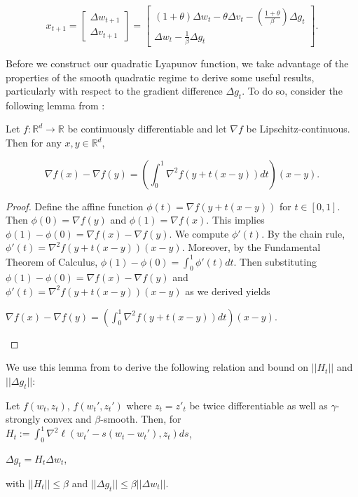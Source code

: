 \documentclass[twoside,11pt]{article}
\begin{document}
\begin{equation}
x_{t+1} = \begin{bmatrix}
    \Delta w_{t+1} \\
    \Delta v_{t+1}
\end{bmatrix} = \begin{bmatrix}
    (1+\theta)\Delta w_t - \theta \Delta v_t - (\frac{1+\theta}{\beta})\Delta g_t \\
    \Delta w_t - \frac{1}{\beta} \Delta g_t
\end{bmatrix}.
\end{equation}

\noindent
Before we construct our quadratic Lyapunov function, we take advantage of the properties of the smooth quadratic regime to derive some useful results, particularly with respect to the gradient difference $\Delta g_t$. To do so, consider the following lemma from \cite{NW06}:

\begin{lemma}
Let $f: \mathbb{R}^d \rightarrow \mathbb{R}$ be continuously differentiable and let $\nabla f$ be Lipschitz-continuous. Then for any $x,y \in \mathbb{R}^d$,

\begin{equation}
\nabla f(x) - \nabla f(y) = (\int_{0}^{1} \nabla^2 f (y + t(x-y))dt)(x-y). 
\end{equation}
\end{lemma}

\begin{proof}
Define the affine function $\phi(t) = \nabla f(y + t(x-y))$ for $t \in [0,1]$. Then $\phi(0) = \nabla f(y)$ and $\phi(1) = \nabla f(x)$. This implies $\phi(1) - \phi(0) = \nabla f(x) - \nabla f(y)$. We compute $\phi'(t)$. By the chain rule, $\phi'(t) = \nabla^2 f(y + t(x-y))(x-y)$. Moreover, by the Fundamental Theorem of Calculus, $\phi(1) - \phi(0) = \int_{0}^{1} \phi'(t)dt$. Then substituting $\phi(1) - \phi(0) = \nabla f(x) - \nabla f(y)$ and $\phi'(t) = \nabla^2 f(y + t(x-y))(x-y)$ as we derived yields

\begin{center}
$\nabla f(x) - \nabla f(y) = (\int_{0}^{1} \nabla^2 f (y + t(x-y))dt)(x-y)$.
\end{center}
\end{proof}

\noindent
We use this lemma from \cite{NW06} to derive the following relation and bound on $||H_t||$ and $||\Delta g_t||$:

\begin{theorem}
Let $f(w_t, z_t)$, $f (w_t', z_t')$ where $z_t = z'_t$ be twice differentiable as well as $\gamma$-strongly convex and $\beta$-smooth. Then, for $H_t := \int_{0}^{1} \nabla^2 \ell (w_t' - s(w_t - w_t'), z_t)ds$, 

\begin{center}
$\Delta g_t = H_t \Delta w_t$,
\end{center}

\noindent
with $||H_t|| \leq \beta$ and $||\Delta g_t|| \leq \beta ||\Delta w_t||$.
\end{theorem}
\end{document}
